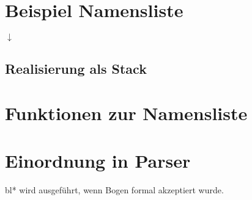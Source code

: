 \section{Beispiel Namensliste}
\begin{center}
$\downarrow$
\end{center}
\subsection*{Realisierung als Stack}

\section{Funktionen zur Namensliste}
\section{Einordnung in Parser}
bl* wird ausgeführt, wenn Bogen formal akzeptiert wurde.






